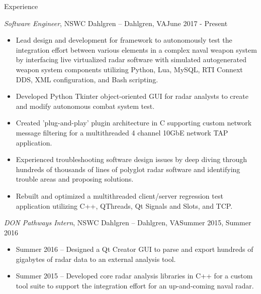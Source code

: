 \documentclass[]{mcdowellcv}
\begin{document}
	\makeheader
	
	\begin{cvsection}{Experience}
		\begin{cvsubsection}{\textit{Software Engineer}, NSWC Dahlgren -- Dahlgren, VA}{June 2017 - Present}
			\begin{itemize}
				\item Lead design and development for framework to autonomously test the integration effort between various elements in a complex naval weapon system by interfacing live virtualized radar software with simulated autogenerated weapon system components utilizing Python, Lua, MySQL, RTI Connext DDS, XML configuration, and Bash scripting. 
				\item Developed Python Tkinter object-oriented GUI for radar analysts to create and modify autonomous combat system test.
				\item Created 'plug-and-play' plugin architecture in C supporting custom network message filtering for a multithreaded 4 channel 10GbE network TAP application.  
				\item Experienced troubleshooting software design issues by deep diving through hundreds of thousands of lines of polyglot radar software and identifying trouble areas and proposing solutions.  
				\item Rebuilt and optimized a multithreaded client/server regression test application utilizing C++, QThreads, Qt Signals and Slots, and TCP.   
			\end{itemize}
		\end{cvsubsection}
		
		\begin{cvsubsection}{\textit{DON Pathways Intern}, NSWC Dahlgren -- Dahlgren, VA}{Summer 2015, Summer 2016}	
			\begin{itemize}
				\item Summer 2016 -- Designed a Qt Creator GUI to parse and export hundreds of gigabytes of radar data to an external analysis tool.  
				\item Summer 2015 -- Developed core radar analysis libraries in C++ for a custom tool suite to support the integration effort for an up-and-coming naval radar.  
			\end{itemize}
		\end{cvsubsection}
	\end{cvsection}
	
\end{document}
